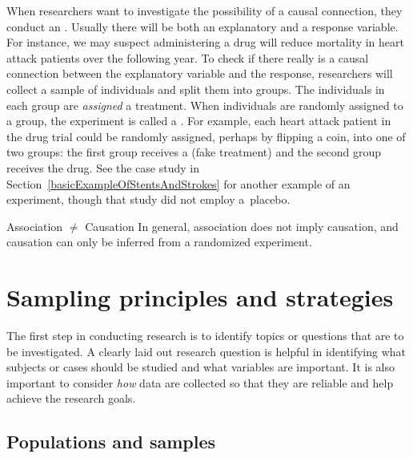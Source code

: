 When researchers want to investigate the possibility of
a causal connection, they conduct an .
Usually there will be both an explanatory and a response
variable.
For instance, we may suspect administering a drug will reduce
mortality in heart attack patients over the following year.
To check if there really is a causal connection between the
explanatory variable and the response, researchers will collect
a sample of individuals and split them into groups.
The individuals in each group are \emph{assigned} a treatment.
When individuals are randomly assigned to a group,
the experiment is called a .
For example, each heart attack patient in the drug trial
could be randomly assigned,  perhaps by flipping a coin,
into one of two groups:
the first group receives a  (fake treatment)
and the second group receives the drug.
See the case study in
Section~\ref{basicExampleOfStentsAndStrokes} for another
example of an experiment, though that study did not employ
a~placebo.

\begin{onebox}{Association $\neq$ Causation}
  In general, association does not imply causation,
  and causation can only be inferred from a randomized experiment.
\end{onebox}


{}




\section{Sampling principles and strategies}
\label{overviewOfDataCollectionPrinciples}
\label{section_obs_data_sampling}


The first step in conducting research is to identify topics
or questions that are to be investigated.
A clearly laid out research question is helpful in identifying
what subjects or cases should be studied and what variables are
important.
It is also important to consider \emph{how} data are collected
so that they are reliable and help achieve the research goals.


\subsection{Populations and samples}
\label{populationsAndSamples}

